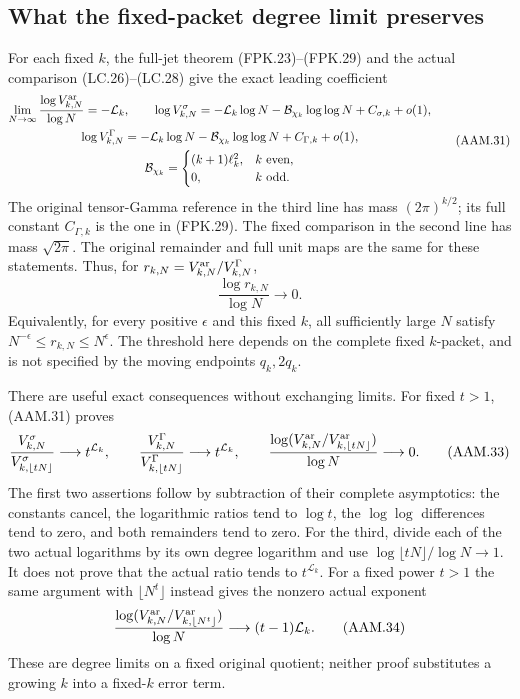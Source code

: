 \subsection{What the fixed-packet degree limit preserves}

For each fixed $k$, the full-jet theorem (FPK.23)--(FPK.29) and
the actual comparison (LC.26)--(LC.28) give the exact leading
coefficient
\[
 \begin{gathered}
 \lim_{N\to\infty}\frac{\log V_{k,N}^{\rm ar}}{\log N}
       =-\mathcal L_k,\qquad
 \log V_{k,N}^\sigma=-\mathcal L_k\log N
                      -\mathcal B_{\chi_k}\log\log N+C_{\sigma,k}+o(1),\\
 \log V_{k,N}^{\Gamma}=-\mathcal L_k\log N
                      -\mathcal B_{\chi_k}\log\log N+C_{\Gamma,k}+o(1),\\
 \mathcal B_{\chi_k}=
 \begin{cases}(k+1)\ell_k^2,&k\text{ even},\\0,&k\text{ odd}.
 \end{cases}
 \end{gathered}
 \tag{AAM.31}
\]
The original tensor-Gamma reference in the third line has mass
$(2\pi)^{k/2}$; its full constant $C_{\Gamma,k}$ is the one in
(FPK.29). The fixed comparison in the second line has mass
$\sqrt{2\pi}$. The original remainder and full unit maps are the
same for these statements. Thus, for $r_{k,N}=V_{k,N}^{\rm ar}/
V_{k,N}^{\Gamma}$,
\[
 \frac{\log r_{k,N}}{\log N}\longrightarrow0.
 \tag{AAM.32}
\]
Equivalently, for every positive $\epsilon$ and this fixed $k$, all
sufficiently large $N$ satisfy $N^{-\epsilon}\leq r_{k,N}\leq
N^\epsilon$. The threshold here depends on the complete fixed
$k$-packet, and is not specified by the moving endpoints $q_k,2q_k$.

There are useful exact consequences without exchanging limits.
For fixed $t>1$, (AAM.31) proves
\[
 \frac{V_{k,N}^\sigma}{V_{k,\lfloor tN\rfloor}^\sigma}
       \longrightarrow t^{\mathcal L_k},\qquad
 \frac{V_{k,N}^{\Gamma}}{V_{k,\lfloor tN\rfloor}^{\Gamma}}
       \longrightarrow t^{\mathcal L_k},\qquad
 \frac{\log(V_{k,N}^{\rm ar}/V_{k,\lfloor tN\rfloor}^{\rm ar})}
          {\log N}\longrightarrow0.
 \tag{AAM.33}
\]
The first two assertions follow by subtraction of their complete
asymptotics: the constants cancel, the logarithmic ratios tend to
$\log t$, the $\log\log$ differences tend to zero, and both
remainders tend to zero. For the third, divide each of the two
actual logarithms by its own degree logarithm and use
$\log\lfloor tN\rfloor/\log N\to1$. It does not prove that
the actual ratio tends to $t^{\mathcal L_k}$.
For a fixed power $t>1$ the same argument with $\lfloor N^t\rfloor$
instead gives the nonzero actual exponent
\[
 \frac{\log(V_{k,N}^{\rm ar}/V_{k,\lfloor N^t\rfloor}^{\rm ar})}
          {\log N}\longrightarrow(t-1)\mathcal L_k.
 \tag{AAM.34}
\]
These are degree limits on a fixed original quotient; neither proof
substitutes a growing $k$ into a fixed-$k$ error term.

